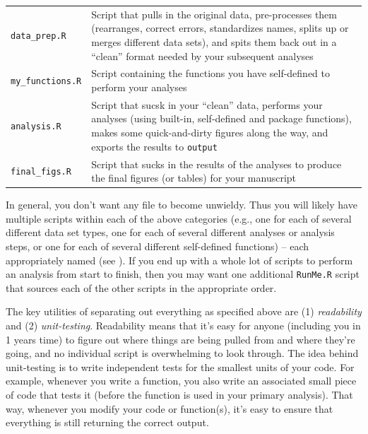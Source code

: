 \documentclass[12pt,letterpaper]{article}
\begin{document}
\begin{tabular}{p{0.2\linewidth}p{0.8\linewidth}}
	\texttt{data\_prep.R} & Script that pulls in the original data, pre-processes them (rearranges, correct errors, standardizes names, splits up or merges different data sets), and spits them back out in a ``clean'' format needed by your subsequent analyses \\
	\texttt{my\_functions.R} & Script containing the functions you have self-defined to perform your analyses \\
	\texttt{analysis.R} & Script that sucsk in your ``clean'' data, performs your analyses (using built-in, self-defined and package functions), makes some quick-and-dirty figures along the way, and exports the results to \texttt{output} \\
	\texttt{final\_figs.R} & Script that sucks in the results of the analyses to produce the final figures (or tables) for your manuscript\\

\end{tabular}

In general, you don't want any file to become unwieldy.  Thus you will likely have multiple scripts within each of the above categories (e.g., one for each of several different data set types, one for each of several different analyses or analysis steps, or one for each of several different self-defined functions) -- each appropriately named (see ).  If you end up with a whole lot of scripts to perform an analysis from start to finish, then you may want one additional \texttt{RunMe.R} script that sources each of the other scripts in the appropriate order.


The key utilities of separating out everything as specified above are (1) \emph{readability} and (2) \emph{unit-testing}.    Readability means that it's easy for anyone (including you in 1 years time) to figure out where things are being pulled from and where they're going, and no individual script is overwhelming to look through.  The idea behind unit-testing is to write independent tests for the smallest units of your code.  For example, whenever you write a function, you also write an associated small piece of code that tests it (before the function is used in your primary analysis). That way, whenever you modify your code or function(s), it's easy to ensure that everything is still returning the correct output.
\end{document}
